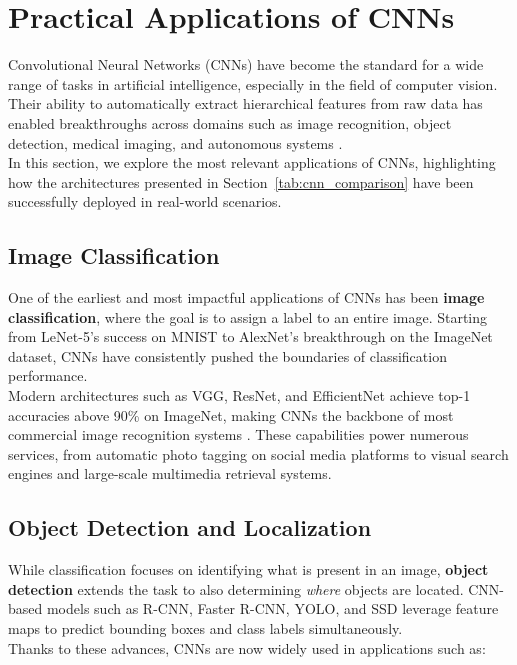 \chapter{Practical Applications of CNNs}

Convolutional Neural Networks (CNNs) have become the standard for a wide range of tasks in artificial intelligence, especially in the field of computer vision. 
Their ability to automatically extract hierarchical features from raw data has enabled breakthroughs across domains such as image recognition, object detection, medical imaging, and autonomous systems \cite{li2021survey, zhao2024review}.
\\
In this section, we explore the most relevant applications of CNNs, highlighting how the architectures presented in Section~\ref{tab:cnn_comparison} have been successfully deployed in real-world scenarios.

\section{Image Classification}

One of the earliest and most impactful applications of CNNs has been \textbf{image classification}, where the goal is to assign a label to an entire image. 
Starting from LeNet-5's success on MNIST to AlexNet's breakthrough on the ImageNet dataset, CNNs have consistently pushed the boundaries of classification performance.
\\
Modern architectures such as VGG, ResNet, and EfficientNet achieve top-1 accuracies above 90\% on ImageNet, making CNNs the backbone of most commercial image recognition systems \cite{li2021survey}. 
These capabilities power numerous services, from automatic photo tagging on social media platforms to visual search engines and large-scale multimedia retrieval systems.

\section{Object Detection and Localization}

While classification focuses on identifying what is present in an image, \textbf{object detection} extends the task to also determining \textit{where} objects are located.
CNN-based models such as R-CNN, Faster R-CNN, YOLO, and SSD leverage feature maps to predict bounding boxes and class labels simultaneously. 
\\
Thanks to these advances, CNNs are now widely used in applications such as:

